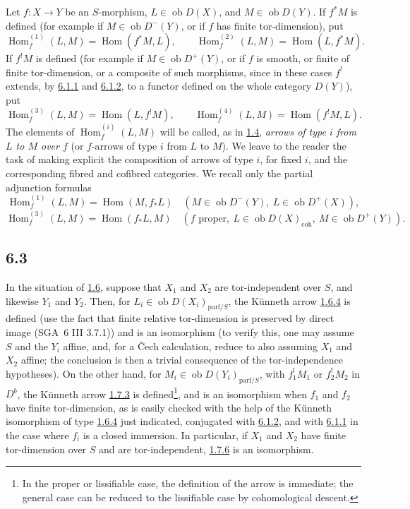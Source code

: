 \documentclass[11pt]{article}
\DeclareMathOperator{\Hom}{Hom}
\providecommand{\Hom}{\operatorname{Hom}}
\providecommand{\Hom}{\operatorname{Hom}}
\begin{document}
Let $f:X\to Y$ be an $S$-morphism, $L\in\operatorname{ob}D(X)$, and $M\in\operatorname{ob}D(Y)$. If $f^*M$ is defined (for example if $M\in\operatorname{ob}D^-(Y)$, or if $f$ has finite tor-dimension), put
\[
\Hom_f^{(1)}(L,M)=\Hom(f^*M,L),\qquad
\Hom_f^{(2)}(L,M)=\Hom(L,f^*M).
\]
If $f^!M$ is defined (for example if $M\in\operatorname{ob}D^+(Y)$, or if $f$ is smooth, or finite of finite tor-dimension, or a composite of such morphisms, since in these cases $f^!$ extends, by \hyperref[sga5:III:equation:6.1.1]{6.1.1} and \hyperref[sga5:III:equation:6.1.2]{6.1.2}, to a functor defined on the whole category $D(Y)$), put
\[
\Hom_f^{(3)}(L,M)=\Hom(L,f^!M),\qquad
\Hom_f^{(4)}(L,M)=\Hom(f^!M,L).
\]
The elements of $\Hom_f^{(i)}(L,M)$ will be called, as in \hyperref[sga5:III:subsection:1.4]{1.4}, \emph{arrows of type $i$ from $L$ to $M$ over $f$} (or $f$-arrows of type $i$ from $L$ to $M$). We leave to the reader the task of making explicit the composition of arrows of type $i$, for fixed $i$, and the corresponding fibred and cofibred categories. We recall only the partial adjunction formulas
\[
\Hom_f^{(1)}(L,M)=\Hom(M,f_*L)\quad(M\in\operatorname{ob}D^{-}(Y),\ L\in\operatorname{ob}D^+(X)),
\]
\[
\Hom_f^{(3)}(L,M)=\Hom(f_*L,M)\quad(f\text{ proper},\ L\in\operatorname{ob}D(X)_{\mathrm{coh}},\ M\in\operatorname{ob}D^+(Y)).
\]

\subsection*{6.3}\label{sga5:III:subsection:6.3}
In the situation of \hyperref[sga5:III:subsection:1.6]{1.6}, suppose that $X_1$ and $X_2$ are tor-independent over $S$, and likewise $Y_1$ and $Y_2$. Then, for $L_i\in\operatorname{ob}D(X_i)_{\mathrm{parf}/S}$, the Künneth arrow \hyperref[sga5:III:equation:1.6.4]{1.6.4} is defined (use the fact that finite relative tor-dimension is preserved by direct image (SGA~6 III 3.7.1)) and is an isomorphism (to verify this, one may assume $S$ and the $Y_i$ affine, and, for a Čech calculation, reduce to also assuming $X_1$ and $X_2$ affine; the conclusion is then a trivial consequence of the tor-independence hypotheses). On the other hand, for $M_i\in\operatorname{ob}D(Y_i)_{\mathrm{parf}/S}$, with $f_1^!M_1$ or $f_2^!M_2$ in $D^b$, the Künneth arrow \hyperref[sga5:III:equation:1.7.3]{1.7.3} is defined\footnote{In the proper or lissifiable case, the definition of the arrow is immediate; the general case can be reduced to the lissifiable case by cohomological descent.}, and is an isomorphism when $f_1$ and $f_2$ have finite tor-dimension, as is easily checked with the help of the Künneth isomorphism of type \hyperref[sga5:III:equation:1.6.4]{1.6.4} just indicated, conjugated with \hyperref[sga5:III:equation:6.1.2]{6.1.2}, and with \hyperref[sga5:III:equation:6.1.1]{6.1.1} in the case where $f_i$ is a closed immersion. In particular, if $X_1$ and $X_2$ have finite tor-dimension over $S$ and are tor-independent, \hyperref[sga5:III:equation:1.7.6]{1.7.6} is an isomorphism.
\end{document}
